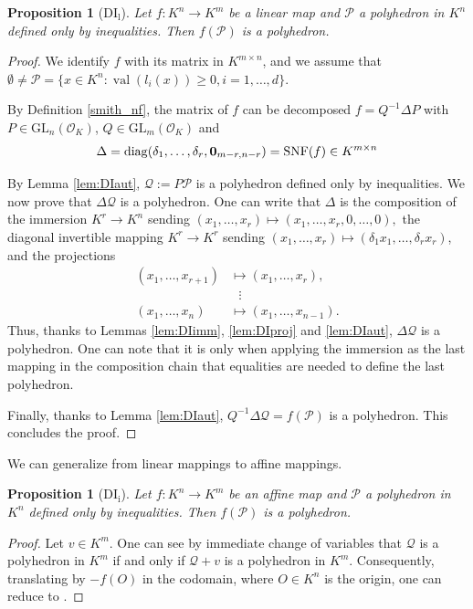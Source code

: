 \documentclass{elsarticle}
\theoremstyle{plain}
\newtheorem{proposition}[theorem]{Proposition}
\theoremstyle{definition}
\newcommand{\N}{\mathbb{N}} %
\newcommand{\PP}{\mathcal{P}}
\newcommand{\Qc}{\mathcal{Q}}
\DeclareMathOperator{\val}{val}
\newcommand{\OK}{\mathcal{O}_K}
\def\diag{\mathrm{diag}}
\newcommand{\GL}{\mathrm{GL}}
\begin{document}
\begin{proposition}[DI${}_{\mathrm{l}}$]
Let $f : K^n \to K^m$ be a linear map and $\PP$ a polyhedron in $K^n$ defined only by inequalities.
Then $f(\PP)$ is a polyhedron. \label{prop:DIl}
\end{proposition}
\begin{proof}
  We identify $f$ with its matrix in $K^{m \times n}$, and we
  assume that $\emptyset \neq \PP = \{x \in K^n : \val(l_i(x)) \geq 0, i=1,\ldots,d\}$.

  By Definition \ref{smith_nf}, the matrix of $f$ can be decomposed
  $f = Q^{-1} \Delta P$ with $P \in \GL_n(\OK)$, $Q \in \GL_m(\OK)$ and
  $$
  \Delta = \diag(\delta_1, \ldots, \delta_r, {\bf 0}_{m-r,n-r}) = \mathrm{SNF}(f)\in K^{m \times n}
  $$

By Lemma \ref{lem:DIaut}, $\Qc := P \PP$ is a polyhedron defined only by inequalities.
We now prove that $\Delta \Qc$ is a polyhedron. One can write that $\Delta$ is the composition
of the immersion 
$K^r \rightarrow K^n$ sending
$(x_1,\dots,x_r)\mapsto (x_1,\dots,x_r,0,\dots,0),$ 
 the diagonal invertible mapping
$K^r \rightarrow K^r$ sending
$(x_1,\dots,x_r)\mapsto (\delta_1 x_1,\dots,\delta_r x_r)$,
and the projections
\begin{equation*}
  \begin{aligned}
    (x_1,\dots,x_{r+1}) &\mapsto (x_1,\dots,x_{r}),   \\
    & \,\,\,\, \vdots \\
    (x_1,\dots,x_{n}) &\mapsto (x_1,\dots,x_{n-1}).
  \end{aligned}
\end{equation*}
Thus, thanks to Lemmas \ref{lem:DIimm}, \ref{lem:DIproj} and \ref{lem:DIaut},
$\Delta \Qc$ is a polyhedron. One can note that it is only when applying the
immersion as the last mapping in the composition chain that equalities are
needed to define the last polyhedron.

Finally, thanks to Lemma \ref{lem:DIaut},
$Q^{-1} \Delta \Qc = f(\PP)$ is a polyhedron.
This concludes the proof.
\end{proof}

We can generalize from linear mappings to affine mappings.
\begin{proposition}[DI${}_{\mathrm{i}}$]
Let $f : K^n \to K^m$ be an affine map and $\PP$ a polyhedron in $K^n$ defined only by inequalities.
Then $f(\PP)$ is a polyhedron. \label{prop:DIi}
\end{proposition}
\begin{proof}
  Let $v \in K^m$. One can see by immediate change
  of variables that $\Qc$ is a polyhedron in $K^m$ if and only if
  $\Qc+v$ is a polyhedron in $K^m$.
  Consequently, translating by $-f(O)$ in the codomain, where
  $O \in K^n$ is the origin, one can reduce to .
\end{proof}
\end{document}
